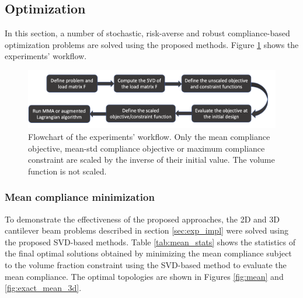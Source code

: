   \subsection{Optimization}

    In this section, a number of stochastic, risk-averse and robust compliance-based optimization problems are solved using the proposed methods. Figure \ref{fig:flowchart} shows the experiments' workflow.

    \begin{figure}
      \centering
      \includegraphics[width=\textwidth]{./images/robust_exact/flowchart.png}
      \caption{Flowchart of the experiments' workflow. Only the mean compliance objective, mean-std compliance objective or maximum compliance constraint are scaled by the inverse of their initial value. The volume function is not scaled.}
      \label{fig:flowchart}
    \end{figure}

    \subsubsection{Mean compliance minimization}

      To demonstrate the effectiveness of the proposed approaches, the 2D and 3D cantilever beam problems described in section \ref{sec:exp_impl} were solved using the proposed SVD-based methods. Table \ref{tab:mean_stats} shows the statistics of the final optimal solutions obtained by minimizing the mean compliance subject to the volume fraction constraint using the SVD-based method to evaluate the mean compliance. The optimal topologies are shown in Figures \ref{fig:mean} and \ref{fig:exact_mean_3d}.

